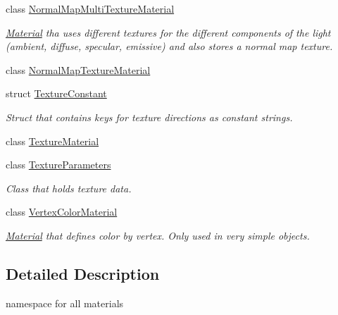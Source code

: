 \begin{DoxyCompactItemize}
class \mbox{\hyperlink{class_geometry_engine_1_1_geometry_material_1_1_normal_map_multi_texture_material}{Normal\+Map\+Multi\+Texture\+Material}}
\begin{DoxyCompactList}\small\item\em \mbox{\hyperlink{class_geometry_engine_1_1_geometry_material_1_1_material}{Material}} tha uses different textures for the different components of the light (ambient, diffuse, specular, emissive) and also stores a normal map texture. \end{DoxyCompactList}\item 
class \mbox{\hyperlink{class_geometry_engine_1_1_geometry_material_1_1_normal_map_texture_material}{Normal\+Map\+Texture\+Material}}
\item 
struct \mbox{\hyperlink{struct_geometry_engine_1_1_geometry_material_1_1_texture_constant}{Texture\+Constant}}
\begin{DoxyCompactList}\small\item\em Struct that contains keys for texture directions as constant strings. \end{DoxyCompactList}\item 
class \mbox{\hyperlink{class_geometry_engine_1_1_geometry_material_1_1_texture_material}{Texture\+Material}}
\item 
class \mbox{\hyperlink{class_geometry_engine_1_1_geometry_material_1_1_texture_parameters}{Texture\+Parameters}}
\begin{DoxyCompactList}\small\item\em Class that holds texture data. \end{DoxyCompactList}\item 
class \mbox{\hyperlink{class_geometry_engine_1_1_geometry_material_1_1_vertex_color_material}{Vertex\+Color\+Material}}
\begin{DoxyCompactList}\small\item\em \mbox{\hyperlink{class_geometry_engine_1_1_geometry_material_1_1_material}{Material}} that defines color by vertex. Only used in very simple objects. \end{DoxyCompactList}\end{DoxyCompactItemize}


\subsection{Detailed Description}
namespace for all materials 